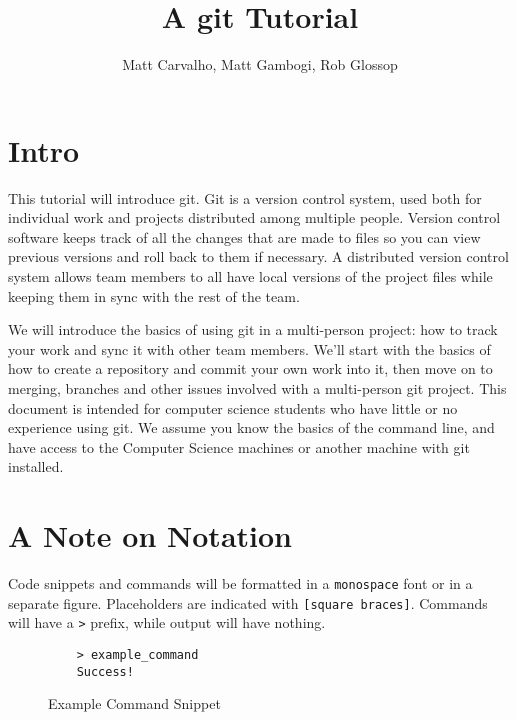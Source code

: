 \documentclass[11pt]{report}
\title{A git Tutorial}
\author{Matt Carvalho, Matt Gambogi, Rob Glossop}
\begin{document}
\thispagestyle{empty}
\maketitle

\clearpage {} 

\tableofcontents

\listoffigures

\clearpage {}
\section{Intro}
This tutorial will introduce git.  Git is a version control system,
used both for individual work and projects distributed among multiple
people.  Version control software keeps track of all the changes that
are made to files so you can view previous versions and roll back to
them if necessary.  A distributed version control system allows team
members to all have local versions of the project files while keeping
them in sync with the rest of the team.

We will introduce the basics of using git in a multi-person project:
how to track your work and sync it with other team members. We'll
start with the basics of how to create a repository and commit your
own work into it, then move on to merging, branches and other issues
involved with a multi-person git project. This document is intended
for computer science students who have little or no experience using
git. We assume you know the basics of the command line, and have
access to the Computer Science machines or another machine with git
installed.

\section{A Note on Notation}
Code snippets and commands will be formatted in a \texttt{monospace} font or in
a separate figure. Placeholders are indicated with \texttt{[square
    braces]}. Commands will have a \texttt{>} prefix, while output
will have nothing.
\begin{figure}[H]
  \caption{Example Command Snippet}
  \begin{lstlisting}
    > example_command
    Success!
  \end{lstlisting}
\end{figure}
\end{document}
